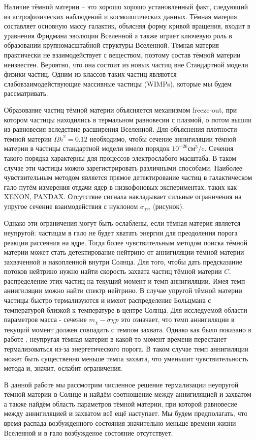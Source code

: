 Наличие тёмной материи – это хорошо хорошо установленный факт, следующий из астрофизических наблюдений и космологических данных. Тёмная материя составляет основную массу галактик, объясняя форму кривой вращения, входит в уравнения Фридмана эволюции Вселенной а также играет ключевую роль в образовании крупномасштабной структуры Вселенной. 	Тёмная материя практически не взаимодействует с веществом, поэтому состав тёмной материи неизвестен. Вероятно, что она состоит из новых частиц вне Стандартной модели физики частиц. Одним из классов таких частиц являются слабовзаимодействующие массивные частицы (WIMPs), которые мы будем рассматривать.


Образование частиц тёмной материи объясняется механизмом freeze-out, при котором частицы находились в термальном равновесии с  плазмой, о потом вышли из равновесия вследствие расширения Вселенной. Для объяснения плотности тёмной материи $\Omega h^2 = 0.12$ необходимо, чтобы сечение аннигиляции тёмной материи в частицы стандартной модели имело порядок $10^{-26} \text{см}^3/\text{c}$. Сечения такого порядка характерны для процессов электрослабого масштаба. В таком случае эти частицы можно зарегистрировать различными способами. Наиболее чувствительным методом является прямое детектирование частиц в галактическом гало путём измерения отдачи ядер в низкофоновых экспериментах, таких как XENON, PANDAX. Отсутствие сигнала накладывает сильные ограничения на упругое сечение взаимодействия с нуклоном $\sigma_{\chi n}$ (рисунок).


Однако эти ограничения могут быть ослаблены, если тёмная материя является неупругой: частицам в гало не будет хватать энергии для преодоления порога реакции рассеяния на ядре. Тогда более чувствительным методом поиска тёмной материи может стать детектирование нейтрино от аннигиляции тёмной материи захваченной и накопленной внутри Солнца. Для того, чтобы дать предсказание потоков нейтрино нужно найти скорость захвата частиц тёмной материи $C$, распределение этих частиц на текущий момент и темп аннигиляции. Имея темп аннигиляции можно найти спектр нейтрино. В случае упругой тёмной материи частицы быстро термализуются и имеют распределение Больцмана с температурой близкой к температуре в центре Солнца. Для исследуемой области параметров масса - сечение $m_{\chi} - \sigma{\chi p}$ это означает, что темп аннигиляции в текущий момент должен совпадать с темпом захвата. Однако как было показано в работе \cite{Distribution_2018}, неупругая тёмная материя в какой-то момент времени перестанет термализоваться из-за энергетического порога. В таком случае темп аннигиляции может быть существенно меньше темпа захвата, что уменьшит чувствительность метода и, значит, ослабит ограничения.


В данной работе мы рассмотрим численное решение термализации неупругой тёмной материи в Солнце и найдём соотношение между аннигиляцией и захватом а также найдём область параметров тёмной материи, при которой равновесие между аннигиляцией и захватом всё ещё наступает. Мы будем предполагать, что время распада возбужденного состояния значительно меньше времени жизни Вселенной и в гало возбужденое состояние отсутствует.